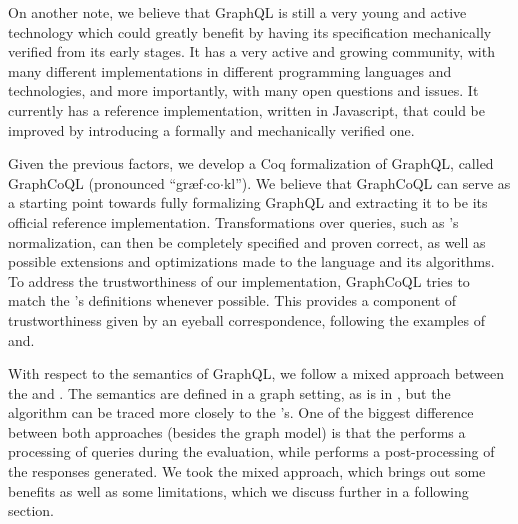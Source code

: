 
On another note, we believe that GraphQL is still a very young and active technology which could greatly benefit by having its specification mechanically verified from its early stages. It has a very active and growing community, with many different implementations in different programming languages and technologies, and more importantly, with many open questions and issues. It currently has a reference implementation, written in Javascript, that could be improved by introducing a formally and mechanically verified one. %

 Given the previous factors, we develop a Coq formalization of GraphQL, called 
 GraphCoQL (pronounced ``græf$\cdot$co$\cdot$k{\pmschwa}l'').
 We believe that GraphCoQL can serve as a starting point towards fully formalizing GraphQL and extracting it to be its official reference implementation.  Transformations over queries, such as \HP{}'s normalization, can then be completely specified and proven correct, as well as possible extensions and optimizations made to the language and its algorithms. To address the trustworthiness of our implementation, GraphCoQL tries to match the \spec{}'s definitions whenever possible. This provides a component of trustworthiness given by an eyeball correspondence, following the examples of~\cite{jscert} and\cite{coqr}.


With respect to the semantics of GraphQL, we follow a mixed approach between the \spec{} and \HP{}. The semantics are defined in a graph setting, as is in \HP{}, but the algorithm can be traced more closely to the \spec{}'s. One of the biggest difference between both approaches (besides the graph model) is that the \spec{} performs a processing of queries during the evaluation, while \HP{} performs a post-processing of the responses generated. We took the mixed approach, which brings out some benefits as well as some limitations, which we discuss further in a following section.

